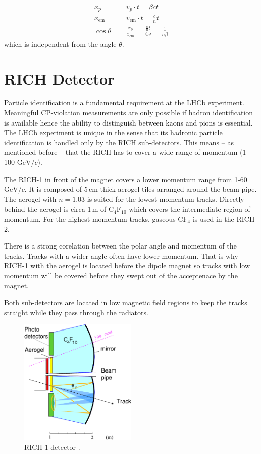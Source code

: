 \documentclass[11pt,twoside]{scrreprt}
\begin{document}
\begin{align}
    x_p &= v_{p}\cdot t = \beta c t \nonumber \\
    x_{\text{em}} &= v_{\text{em}}\cdot t=\frac{c}{n}t \nonumber \\
    \cos\theta &= \frac{x_{\text{p}}}{x_{\text{em}}} = \frac{\frac{c}{n}t}{\beta c t} = \frac{1}{n\beta} \nonumber
\end{align}
which is independent from the angle \( \theta \).

\section{RICH Detector} %
\label{sec:rich_detector}

Particle identification is a fundamental requirement at the LHCb experiment. Meaningful CP-violation measurements are only possible if hadron identification is available hence the ability to distinguish between kaons and pions is  essential.
The LHCb experiment is unique in the sense that its hadronic particle identification is handled only by the RICH sub-detectors. This means -- as mentioned before -- that the RICH has to cover a wide range of momentum (1-100 $\text{GeV}/c$).

The RICH-1 in front of the magnet covers a lower momentum range from 1-60 $\text{GeV}/c$. It is composed of 5\,cm thick aerogel tiles arranged around the beam pipe. The aerogel with $n=1.03$ is suited for the lowest momentum tracks. Directly behind the aerogel is circa 1\,m of $\text{C}_4\text{F}_{10}$ which covers the intermediate region of momentum.
For the highest momentum tracks, gaseous $\text{C}\text{F}_4$ is used in the RICH-2.

There is a strong corelation between the polar angle and momentum of the tracks. Tracks with a wider angle often have lower momentum. That is why RICH-1 with the aerogel is located before the dipole magnet so tracks with low momentum will be covered before they swept out of the acceptenace by the magnet.

Both sub-detectors are located in low magnetic field regions to keep the tracks straight while they pass through the radiators.

\begin{figure}[tb]
  \centering
  \includegraphics[width=0.5\textwidth]{pics/rich1_schematic}
  \caption{RICH-1 detector \cite{LHCb:2000}.}
  \label{fig:rich1}
\end{figure}
\end{document}
